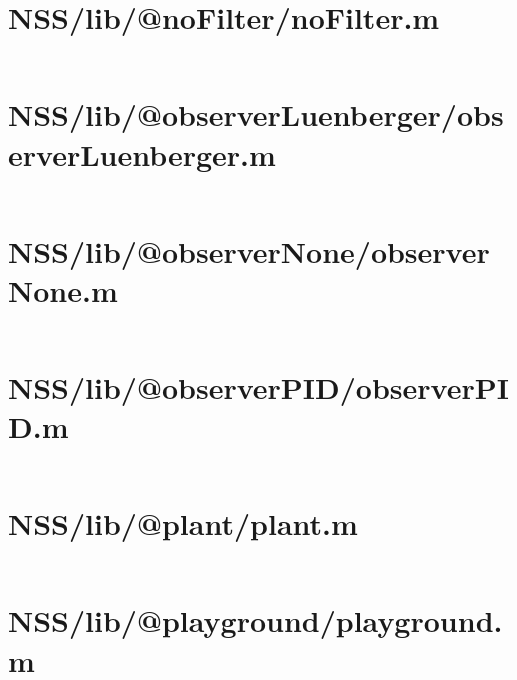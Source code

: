 \pagebreak
\section*{NSS/lib/@noFilter/noFilter.m}\label{code:NSS/lib/@noFilter/noFilter.m}
\inputminted[linenos,fontsize=\scriptsize]{matlab}{/home/dcouture/git/mathyourlife/TSatPy/beta_versions/matlab_object_oriented/lib/@noFilter/noFilter.m}

\pagebreak
\section*{NSS/lib/@observerLuenberger/observerLuenberger.m}\label{code:NSS/lib/@observerLuenberger/observerLuenberger.m}
\inputminted[linenos,fontsize=\scriptsize]{matlab}{/home/dcouture/git/mathyourlife/TSatPy/beta_versions/matlab_object_oriented/lib/@observerLuenberger/observerLuenberger.m}

\pagebreak
\section*{NSS/lib/@observerNone/observerNone.m}\label{code:NSS/lib/@observerNone/observerNone.m}
\inputminted[linenos,fontsize=\scriptsize]{matlab}{/home/dcouture/git/mathyourlife/TSatPy/beta_versions/matlab_object_oriented/lib/@observerNone/observerNone.m}

\pagebreak
\section*{NSS/lib/@observerPID/observerPID.m}\label{code:NSS/lib/@observerPID/observerPID.m}
\inputminted[linenos,fontsize=\scriptsize]{matlab}{/home/dcouture/git/mathyourlife/TSatPy/beta_versions/matlab_object_oriented/lib/@observerPID/observerPID.m}

\pagebreak
\section*{NSS/lib/@plant/plant.m}\label{code:NSS/lib/@plant/plant.m}
\inputminted[linenos,fontsize=\scriptsize]{matlab}{/home/dcouture/git/mathyourlife/TSatPy/beta_versions/matlab_object_oriented/lib/@plant/plant.m}

\pagebreak
\section*{NSS/lib/@playground/playground.m}\label{code:NSS/lib/@playground/playground.m}
\inputminted[linenos,fontsize=\scriptsize]{matlab}{/home/dcouture/git/mathyourlife/TSatPy/beta_versions/matlab_object_oriented/lib/@playground/playground.m}


